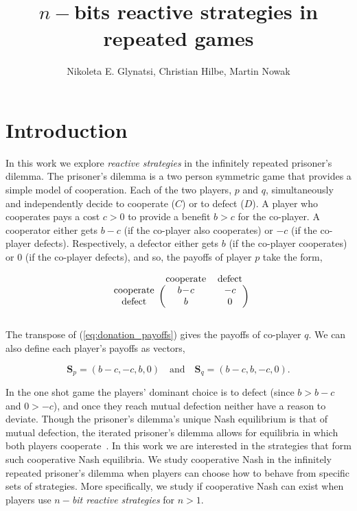 \documentclass{article}
\title{$n-$bits reactive strategies in repeated games}
\author{Nikoleta E. Glynatsi, Christian Hilbe, Martin Nowak}
\date{}
\theoremstyle{definition}
\begin{document}
\maketitle

\section{Introduction}

In this work we explore \textit{reactive strategies} in the infinitely repeated
prisoner's dilemma. The prisoner's dilemma is a two person symmetric game that
provides a simple model of cooperation. Each of the two players, \(p\) and
\(q\), simultaneously and independently decide to cooperate (\(C\)) or to defect
(\(D\)). A player who cooperates pays a cost \(c > 0\) to provide a benefit
\(b > c\) for the co-player. A cooperator either gets \(b\!-\!c\) (if the
co-player also cooperates) or \(-c\) (if the co-player defects). Respectively, a defector either gets
\(b\) (if the co-player cooperates) or 0 (if the co-player defects), and so,
the payoffs of player \(p\) take the form,

\begin{equation}\label{eq:donation_payoffs}
  \begin{blockarray}{ccc}
      & \text{cooperate} & \text{defect} \\
      \begin{block}{c(cc)}
          \text{cooperate} & b\!-\!c & -c \\
          \text{defect} & b & 0 \\
      \end{block}
  \end{blockarray}
\end{equation}

The transpose of (\ref{eq:donation_payoffs}) gives the payoffs of
co-player \(q\). We can also define each player's payoffs as vectors,

\begin{equation}\label{eq:vector_payoffs}
  \mathbf{S}_{p} = (b\!-\!c, -c, b, 0) \quad \textrm{and} \quad  \mathbf{S}_{q} = (b\!-\!c, b, -c, 0).
\end{equation}

In the one shot game the players' dominant choice is to defect (since $b > b\!-\!c$
and $0 > -c$), and once they reach mutual defection neither have a reason to
deviate. Though the prisoner's dilemma's unique Nash equilibrium is that of
mutual defection, the iterated prisoner's dilemma allows for equilibria in which both 
players cooperate~\citep{axelrod:AAAS:1981, hilbe:PNAS:2017}. In this
work we are interested in the strategies that form such cooperative Nash equilibria. 
We study cooperative Nash in the infinitely
repeated prisoner's dilemma when players can choose how to behave from specific
sets of strategies. More specifically, we study if cooperative Nash can exist
when players use \textit{\(n-\)bit reactive strategies} for $n > 1$.
\end{document}
